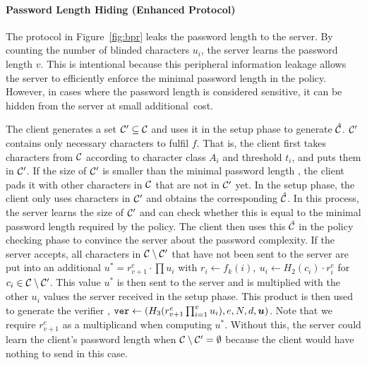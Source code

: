 \paragraph{Password Length Hiding (Enhanced Protocol)} 
The protocol in Figure~\ref{fig:bpr} leaks the password length to the server. By counting the number of blinded characters $u_i$, the server learns the password length $v$. 
This is intentional because this peripheral information leakage allows the server to efficiently enforce the minimal password length in the policy. 
However, in cases where the password length is considered sensitive, it can be hidden from the  server at small additional~cost.

The client generates a set $\mathcal{C}'\subseteq\mathcal{C}$ and uses it in the setup phase to generate $\hat{\mathcal{C}}$. 
$\mathcal{C}'$ contains only necessary characters to fulfil $f$. 
That is, the client first takes characters from $\mathcal{C}$ according to character class $A_i$ and threshold $t_i$, and puts them in $\mathcal{C}'$.
If the size of $\mathcal{C}'$ is smaller than the minimal password length \pmin, the client pads it with other characters in $\mathcal{C}$ that are not in $\mathcal{C}'$ yet. 
In the setup phase, the client only uses characters in $\mathcal{C}'$ and obtains the corresponding $\hat{\mathcal{C}}$. In this process, the server learns the size of $\mathcal{C}'$ and can check whether this is equal to the minimal password length \pmin required by the policy. 
The client then uses this $\hat{\mathcal{C}}$ in the policy checking phase to convince the server about the password complexity. 
If the server accepts, all characters in $\mathcal{C}\setminus\mathcal{C}'$ that have not been sent to the server are put into an additional $u^\ast=r_{v+1}^e\cdot\prod u_i$ with $r_i\gets f_k(i),~ u_i\gets H_2(c_i)\cdot r_i^e$ for $c_i\in\mathcal{C}\setminus\mathcal{C}'$. 
This value $u^\ast$ is then sent to the server and is multiplied with the other $u_i$ values the server received in the setup phase.
This product is then used to generate the verifier \ver, \ie $\mathtt{ver}\gets(H_3(r_{v+1}^e\prod_{i=1}^v u_i), e, N, d, \bm{u})$. 
Note that we require $r_{v+1}^e$ as a multiplicand when computing $u^\ast$. 
Without this, the server could learn the client's password length when $\mathcal{C}\setminus\mathcal{C}'=\emptyset$ because the client would have nothing to send in this case. 

